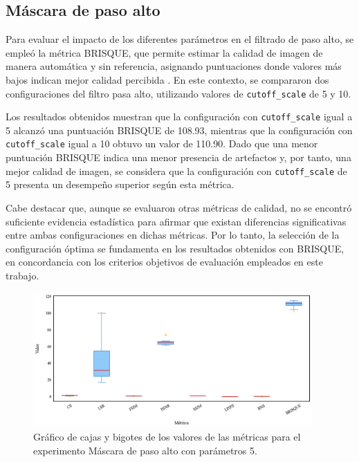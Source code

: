 \subsection{Máscara de paso alto}

Para evaluar el impacto de los diferentes parámetros en el filtrado de paso alto, se empleó la métrica BRISQUE, que permite estimar la calidad de imagen de manera automática y sin referencia, asignando puntuaciones donde valores más bajos indican mejor calidad percibida \cite{BRISQUE}. En este contexto, se compararon dos configuraciones del filtro pasa alto, utilizando valores de \texttt{cutoff\_scale} de 5 y 10.

Los resultados obtenidos muestran que la configuración con \texttt{cutoff\_scale} igual a 5 alcanzó una puntuación BRISQUE de 108.93, mientras que la configuración con \texttt{cutoff\_scale} igual a 10 obtuvo un valor de 110.90. Dado que una menor puntuación BRISQUE indica una menor presencia de artefactos y, por tanto, una mejor calidad de imagen, se considera que la configuración con \texttt{cutoff\_scale} de 5 presenta un desempeño superior según esta métrica.

Cabe destacar que, aunque se evaluaron otras métricas de calidad, no se encontró suficiente evidencia estadística para afirmar que existan diferencias significativas entre ambas configuraciones en dichas métricas. Por lo tanto, la selección de la configuración óptima se fundamenta en los resultados obtenidos con BRISQUE, en concordancia con los criterios objetivos de evaluación empleados en este trabajo.

\begin{figure}[H]
    \centering
    \includegraphics[width=0.95\textwidth]{Graphics/boxplot-highpass-mask.png}
    \caption{Gráfico de cajas y bigotes de los valores de las métricas para el experimento Máscara de paso alto con parámetros 5.}
    \label{fig:boxplot-highpass}
\end{figure}

